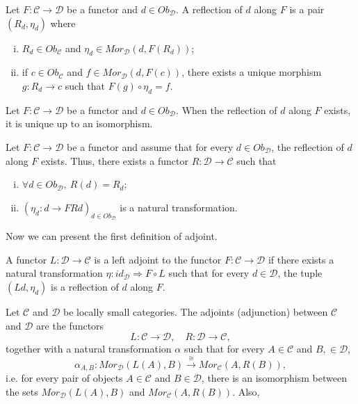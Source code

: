 \begin{definition}[Reflection]
	Let $F:\mathcal C \to \mathcal D$ be a functor and $d \in Ob_\mathcal D$.
	A reflection of $d$ along $F$ is a pair $(R_d, \eta_d)$ where
	\begin{enumerate}[(i)]
		\item $R_d \in Ob_\mathcal C$ and $\eta_d \in Mor_{\mathcal D}(d, F(R_d))$;
		\item if $c \in Ob_\mathcal C$ and $f \in Mor_{\mathcal D}(d,F(c))$, there exists
		      a unique morphism $g:R_d \to c$ such that
		      $F(g) \circ \eta_d = f$.
	\end{enumerate}
\end{definition}

\begin{proposition}
	Let $F:\mathcal C \to \mathcal D$ be a functor and $d \in Ob_\mathcal D$.
	When the reflection of $d$ along $F$ exists, it is unique up to an isomorphism.
\end{proposition}

\begin{proposition}
	Let $F:\mathcal C \to \mathcal D$ be a functor and assume that for every
	$d \in Ob_\mathcal D$, the reflection of $d$ along $F$ exists. Thus, there
	exists a functor $R:\mathcal D \to \mathcal C$ such that
	\begin{enumerate}[(i)]
		\item $\forall d \in Ob_\mathcal D, \ R(d) = R_d$;
		\item $(\eta_d:d \to FRd)_{d \in Ob_\mathcal D}$ is a natural transformation.
	\end{enumerate}
\end{proposition}

Now we can present the first definition of adjoint.
\begin{definition}[Adjoint]
	A functor $L:\mathcal D \to \mathcal C$ is a left adjoint to the functor
	$F:\mathcal C \to \mathcal D$ if there exists a natural transformation
	$\eta:id_{\mathcal D} \Rightarrow F \circ L$ such that for every
	$d \in \mathcal D$, the tuple $(Ld, \eta_d)$ is a reflection of $d$
	along $F$.
\end{definition}

\begin{definition}[Ajdoint]
	Let $\mathcal C$ and $\mathcal D$ be locally small categories. The adjoints (adjunction) between
	$\mathcal C$ and $\mathcal D$ are the functors
	\begin{displaymath}
		L:\mathcal C \to \mathcal D, \quad R:\mathcal D \to \mathcal C,
	\end{displaymath}
	together with a natural transformation $\alpha$ such that for every
	$A \in \mathcal C$ and $B, \in \mathcal D$,
	\begin{displaymath}
		\alpha_{A,B}: Mor_\mathcal D (L(A), B) \overset{\cong}{\longrightarrow} Mor_\mathcal C (A, R(B)),
	\end{displaymath}
	i.e. for every pair of objects $A \in \mathcal C$  and $B \in \mathcal D$, there is an isomorphism
	between the sets $Mor_\mathcal D(L(A), B)$ and $Mor_\mathcal C (A, R(B))$.
	Also,
\end{definition}


